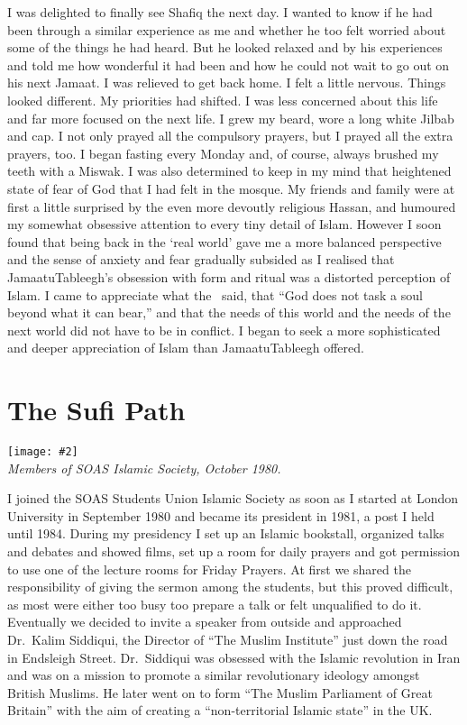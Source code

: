 \documentclass[12pt]{memoir}
\newcommand{\img}[3]{\begin{center}%
\texttt{[image: \#2]}\\{\small\em#3}%
\end{center}}
\begin{document}
I was delighted to finally see Shafiq the next day.
I wanted to know if he had been through a similar experience as me
and whether he too felt worried about some of the things he had heard.
But he looked relaxed and  by his experiences
and told me how wonderful it had been
and how he could not wait to go out on his next Jamaat.
I was relieved to get back home.
I felt a little nervous.
Things looked different.
My priorities had shifted.
I was less concerned about this life and far more focused on the next life.
I grew my beard, wore a long white Jilbab and cap.
I not only prayed all the compulsory prayers,
but I prayed all the extra prayers, too.
I began fasting every Monday and, of course,
always brushed my teeth with a Miswak.
I was also determined to keep in my mind
that heightened state of fear of God that I had felt in the mosque.
My friends and family were at first a little surprised
by the even more devoutly religious Hassan,
and humoured my somewhat obsessive attention to every tiny detail of Islam.
However I soon found that being back in the ‘real world’
gave me a more balanced perspective
and the sense of anxiety and fear gradually subsided
as I realised that Jamaatu\cor{ }{\–}Tableegh’s obsession
with form and ritual was a distorted perception of Islam.
I came to appreciate what the \Quran\ said, that
“God does not task a soul beyond what it can bear,”
and that the needs of this world
and the needs of the next world did not have to be in conflict.
I began to seek a more sophisticated and deeper appreciation of Islam than
Jamaatu\–Tableegh offered.


\chapter{The Sufi Path}

\img{scale=0.7}{Members_SOAS_Islamic_Society.jpg}
{Members of SOAS Islamic Society, October 1980.}

I joined the SOAS Students Union Islamic Society as soon as I started
at London University in September 1980
and became its president in 1981,
a post I held until 1984.
During my presidency I set up an Islamic bookstall,
organized talks and debates and showed films,
set up a room for daily prayers and got permission
to use one of the lecture rooms for Friday Prayers.
At first we shared the responsibility of giving the sermon among the students,
but this proved difficult,
as most were either too busy too prepare a talk or felt unqualified to do it.
Eventually we decided to invite a speaker from outside
and approached Dr.\ Kalim Siddiqui,
the Director of “The Muslim Institute” just down the road in Endsleigh Street.
Dr.\ Siddiqui was obsessed with the Islamic revolution in Iran
and was on a mission to promote a similar revolutionary ideology
amongst British Muslims.
He later went on to form “The Muslim Parliament of Great Britain”
with the aim of creating a “non-territorial Islamic state” in the UK.
\end{document}
